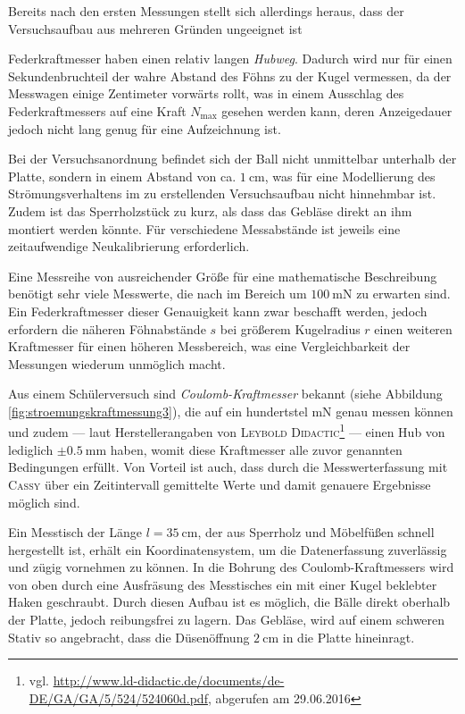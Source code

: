 Bereits nach den ersten Messungen stellt sich allerdings heraus, dass der Versuchsaufbau aus mehreren Gründen ungeeignet ist
\begin{items}
\item Federkraftmesser haben einen relativ langen \textit{Hubweg}. Dadurch wird nur für einen Sekundenbruchteil der wahre Abstand des Föhns zu der Kugel vermessen, da der Messwagen einige Zentimeter vorwärts rollt, was in einem Ausschlag des Federkraftmessers auf eine Kraft $N_\mathrm{max}$ gesehen werden kann, deren Anzeigedauer jedoch nicht lang genug für eine Aufzeichnung ist.
\item Bei der Versuchsanordnung befindet sich der Ball nicht unmittelbar unterhalb der Platte, sondern in einem Abstand von ca. $\SI{1}{\centi\metre}$, was für eine Modellierung des Strömungsverhaltens im zu erstellenden Versuchsaufbau nicht hinnehmbar ist. Zudem ist das Sperrholzstück zu kurz, als dass das Gebläse direkt an ihm montiert werden könnte. Für verschiedene Messabstände ist jeweils eine zeitaufwendige Neukalibrierung erforderlich. 
\item Eine Messreihe von ausreichender Größe für eine mathematische Beschreibung benötigt sehr viele Messwerte, die nach \textcite{Schilling1987} im Bereich um $\SI{100}{\milli\newton}$ zu erwarten sind. Ein Federkraftmesser dieser Genauigkeit kann zwar beschafft werden, jedoch erfordern die näheren Föhnabstände $s$ bei größerem Kugelradius $r$ einen weiteren Kraftmesser für einen höheren Messbereich, was eine Vergleichbarkeit der Messungen wiederum unmöglich macht.
\end{items}



\noindent Aus einem Schülerversuch sind \textit{Coulomb-Kraftmesser} bekannt (siehe Abbildung \ref{fig:stroemungskraftmessung3}), die auf ein hundertstel $\si{\milli\newton}$ genau messen können und zudem --- laut Herstellerangaben von \textsc{Leybold Didactic}\footnote{vgl. \url{http://www.ld-didactic.de/documents/de-DE/GA/GA/5/524/524060d.pdf}, abgerufen am 29.06.2016} --- einen Hub von lediglich $\pm \SI{0.5}{\milli\metre}$ haben, womit diese Kraftmesser alle zuvor genannten Bedingungen erfüllt. Von Vorteil ist auch, dass durch die Messwerterfassung mit \textsc{Cassy} über ein Zeitintervall gemittelte Werte und damit genauere Ergebnisse möglich sind.



\noindent Ein Messtisch der Länge $l=\SI{35}{\centi\metre}$, der aus Sperrholz und Möbelfüßen schnell hergestellt ist, erhält ein Koordinatensystem, um die Datenerfassung zuverlässig und zügig vornehmen zu können. In die Bohrung des Coulomb-Kraftmessers wird von oben durch eine Ausfräsung des Messtisches ein mit einer Kugel beklebter Haken geschraubt. Durch diesen Aufbau ist es möglich, die Bälle direkt oberhalb der Platte, jedoch reibungsfrei zu lagern. Das Gebläse, wird auf einem schweren Stativ so angebracht, dass die Düsenöffnung $\SI{2}{\centi\metre}$ in die Platte hineinragt.

